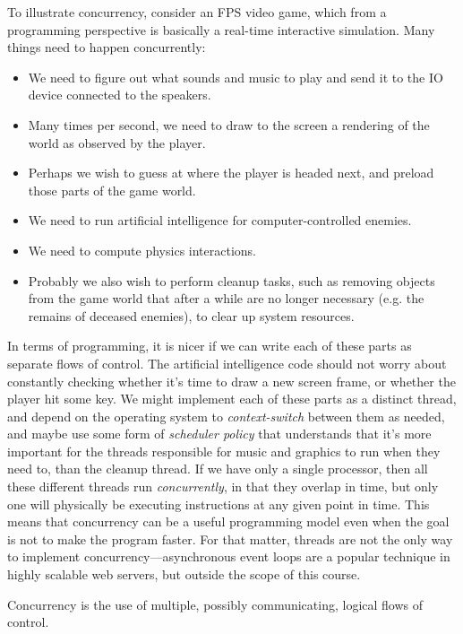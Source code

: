 To illustrate concurrency, consider an FPS video game, which from a
programming perspective is basically a real-time interactive
simulation.  Many things need to happen concurrently:

\begin{itemize}
\item We need to figure out what sounds and music to play and send it
  to the IO device connected to the speakers.
\item Many times per second, we need to draw to the screen a rendering
  of the world as observed by the player.
\item Perhaps we wish to guess at where the player is headed next, and
  preload those parts of the game world.
\item We need to run artificial intelligence for computer-controlled
  enemies.
\item We need to compute physics interactions.
\item Probably we also wish to perform cleanup tasks, such as removing
  objects from the game world that after a while are no longer
  necessary (e.g. the remains of deceased enemies), to clear up system
  resources.
\end{itemize}

In terms of programming, it is nicer if we can write each of these
parts as separate flows of control.  The artificial intelligence code
should not worry about constantly checking whether it's time to draw a
new screen frame, or whether the player hit some key.  We might
implement each of these parts as a distinct thread, and depend on the
operating system to \emph{context-switch} between them as needed, and
maybe use some form of \emph{scheduler policy} that understands that
it's more important for the threads responsible for music and graphics
to run when they need to, than the cleanup thread.  If we have only a
single processor, then all these different threads run
\emph{concurrently}, in that they overlap in time, but only one will
physically be executing instructions at any given point in time.  This
means that concurrency can be a useful programming model even when the
goal is not to make the program faster.  For that matter, threads are
not the only way to implement concurrency---asynchronous event loops
are a popular technique in highly scalable web servers, but outside
the scope of this course.

\begin{definition}[Concurrency]
  Concurrency is the use of multiple, possibly communicating, logical
  flows of control.
\end{definition}

